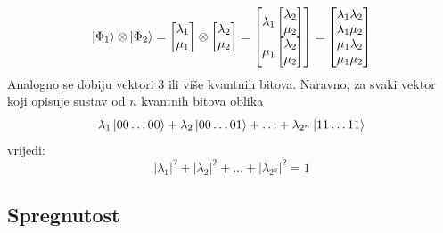 \begin{equation}
\ket{\Phi_1} \otimes \ket{\Phi_2} =
\begin{bmatrix}
\lambda_1 \\ \mu_1
\end{bmatrix}
\otimes
\begin{bmatrix}
\lambda_2 \\ \mu_2
\end{bmatrix}
=
\begin{bmatrix}
\lambda_1
	\begin{bmatrix}
	\lambda_2 \\ \mu_2
	\end{bmatrix} \\
\mu_1
	\begin{bmatrix}
	\lambda_2 \\ \mu_2
	\end{bmatrix}
\end{bmatrix}
=
\begin{bmatrix}
\lambda_1\lambda_2 \\
\lambda_1\mu_2 \\
\mu_1\lambda_2 \\
\mu_1\mu_2 \\
\end{bmatrix}
\end{equation}
Analogno se dobiju vektori 3 ili više kvantnih bitova. Naravno, za svaki vektor koji opisuje sustav od $n$ kvantnih bitova oblika
\begin{equation}
\lambda_1\ket{00 \ldots 00} + \lambda_2\ket{00 \ldots 01} + \ldots + \lambda_{2^n}\ket{11 \ldots 11}
\end{equation}
vrijedi:
\begin{equation}
|\lambda_1|^2 + |\lambda_2|^2 + \ldots + |\lambda_{2^n}|^2 = 1
\label{eq:sumofcoefs}
\end{equation}

\subsection{Spregnutost}

